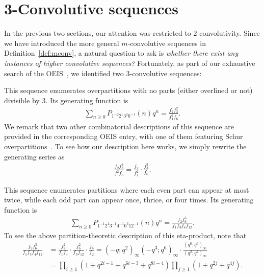 \documentclass[12pt,reqno]{amsart}
\numberwithin{equation}{section}
\theoremstyle{plain}
\theoremstyle{definition}
\theoremstyle{named}
\begin{document}
\section{3-Convolutive sequences}\label{sec:3cons}

In the previous two sections, our attention was restricted to $2$-convolutivity. Since we have introduced the more general $m$-convolutive sequences in Definition~\ref{def:mconv}, a natural question to ask is  \textit{whether there exist any instances of higher convolutive sequences?} Fortunately, as part of our exhaustive search of the OEIS~\cite{OEIS}, we identified two $3$-convolutive sequences:
\begin{description}[itemsep=2pt]
	\item[A098151] This sequence enumerates overpartitions with no parts (either overlined or not) divisible by $3$. Its generating function is
	\begin{align*}
		\sum_{n\ge 0} P_{1^{-2}2^{1}3^{2}6^{-1}}(n) q^n = \frac{f_2 f_3^2}{f_1^2 f_6}.
	\end{align*}
    We remark that two other combinatorial descriptions of this sequence are provided in the corresponding OEIS entry, with one of them featuring Schur overpartitions~\cite[pp.~216--217, Corollary~1.4]{Lov2005}. To see how our description here works, we simply rewrite the generating series as
	\begin{align*}
		\frac{f_2 f_3^2}{f_1^2 f_6} = \frac{f_2}{f_1^2}\cdot \frac{f_3^2}{f_6}.
	\end{align*}

	
	\item[A385520] This sequence enumerates partitions where each even part can appear at most twice, while each odd part can appear once, thrice, or four times. Its generating function is
	\begin{align*}
		\sum_{n\ge 0} P_{1^{-1} 2^1 3^{-1} 4^{-1} 6^3 12^{-1}}(n) q^n = \frac{f_2 f_6^3}{f_1 f_3 f_4 f_{12}}.
	\end{align*}
    To see the above partition-theoretic description of this eta-product, note that 
\begin{align*}
  \frac{f_2 f_6^3}{f_1 f_3 f_4 f_{12}} &= \frac{f_2^2}{f_1f_4}\cdot\frac{f_6^2}{f_3f_{12}}\cdot\frac{f_6}{f_2} = (-q;q^2)_{\infty}(-q^3;q^6)_{\infty}\cdot \frac{(q^6;q^6)_{\infty}}{(q^2;q^2)_{\infty}} \\
  &=\prod_{i\ge 1}(1+q^{2i-1}+q^{6i-3}+q^{8i-4})\prod_{j\ge 1}(1+q^{2j}+q^{4j}).
\end{align*}
\end{description}
\end{document}
